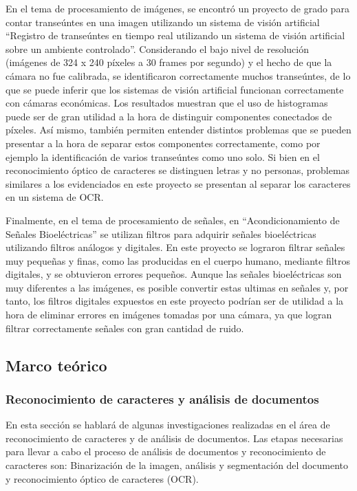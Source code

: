 \documentclass[a4paper, 11pt, oneside]{article}
\begin{document}
	En el tema de procesamiento de imágenes, se encontró un proyecto de grado para contar transeúntes en
    una imagen utilizando un sistema de visión artificial ``Registro de transeúntes en tiempo real utilizando
    un sistema de visión artificial sobre un ambiente controlado''. Considerando el bajo nivel de
	resolución (imágenes de 324 x 240 píxeles a 30 frames por segundo) y el hecho de que la cámara no
	fue calibrada, se identificaron correctamente muchos transeúntes, de lo que se puede inferir que los 
    sistemas de visión artificial funcionan correctamente con cámaras económicas. Los resultados muestran que
	el uso de histogramas puede ser de gran utilidad a la hora de distinguir componentes conectados de 
    píxeles. Así mismo, también permiten entender distintos problemas que se pueden presentar a la hora de
    separar estos componentes correctamente, como por ejemplo la identificación de varios transeúntes como 
    uno solo. Si bien en el reconocimiento óptico de caracteres se distinguen letras y no personas, problemas 
    similares a los evidenciados en este proyecto se presentan al separar los caracteres en un sistema de 
	OCR.\newline
	
	Finalmente, en el tema de procesamiento de señales, en ``Acondicionamiento de Señales Bioeléctricas''
	se utilizan filtros para adquirir señales bioeléctricas utilizando filtros análogos y digitales.
	En este proyecto se lograron filtrar señales muy pequeñas y finas, como las producidas en el cuerpo humano, 
	mediante filtros digitales, y se obtuvieron errores pequeños.
	Aunque las señales bioeléctricas son muy diferentes a las imágenes, es posible 
    convertir estas ultimas en señales y, por tanto, los filtros digitales expuestos en este proyecto podrían 
    ser de utilidad a la hora de eliminar errores en imágenes tomadas por una cámara, ya que logran filtrar
	correctamente señales con gran cantidad de ruido.\newline
	
	\subsection {Marco teórico}
	\subsubsection{Reconocimiento de caracteres y análisis de documentos}
	En esta sección se hablará de algunas investigaciones realizadas en el área
	de reconocimiento de caracteres y de análisis de documentos.
	Las etapas necesarias para llevar a cabo el proceso de análisis de documentos
	y reconocimiento de caracteres son: Binarización de la imagen, análisis y
	segmentación del documento y reconocimiento óptico de caracteres (OCR).
	
\end{document}
